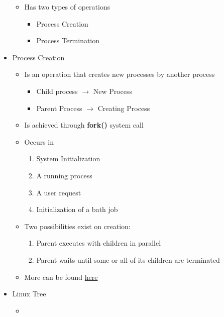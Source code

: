 \documentclass[12pt]{article}
\begin{document}
\begin{itemize}
\begin{itemize}
        \item Has two types of operations
        \begin{itemize}
            \item Process Creation
            \item Process Termination
        \end{itemize}
    \end{itemize}
    \item Process Creation
    \begin{itemize}
        \item Is an operation that creates new processes by another process
        \begin{itemize}
            \item Child process $\to$ New Process
            \item Parent Process $\to$ Creating Process
        \end{itemize}
        \item Is achieved through \textbf{fork()} system call
        \item Occurs in
        \begin{enumerate}[1.]
            \item System Initialization
            \item A running process
            \item A user request
            \item Initialization of a bath job
        \end{enumerate}
        \item Two possibilities exist on creation:
        \begin{enumerate}[1.]
            \item Parent executes with children in parallel
            \item Parent waits until some or all of its children are terminated
        \end{enumerate}
        \item More can be found \href{https://www.youtube.com/watch?v=pSW9d3Oaie8}{here}
    \end{itemize}
    \item Linux Tree
    \begin{itemize}
        \item


\end{itemize}
\end{itemize}
\end{document}
